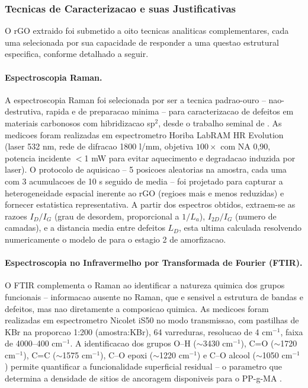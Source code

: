 \documentclass[11pt,a4paper,oneside]{article}
\begin{document}
\subsubsection{Tecnicas de Caracterizacao e suas Justificativas}

O rGO extraido foi submetido a oito tecnicas analiticas complementares, cada uma selecionada
por sua capacidade de responder a uma questao estrutural especifica, conforme detalhado a seguir.

\paragraph{Espectroscopia Raman.} A espectroscopia Raman foi selecionada por ser a tecnica
padrao-ouro -- nao-destrutiva, rapida e de preparacao minima -- para caracterizacao de defeitos
em materiais carbonosos com hibridizacao sp$^2$, desde o trabalho seminal de
\citet{Ferrari2000}. As medicoes foram realizadas em espectrometro Horiba LabRAM HR Evolution
(laser 532 nm, rede de difracao 1800 l/mm, objetiva $100{\times}$ com NA 0,90, potencia
incidente $<$1 mW para evitar aquecimento e degradacao induzida por laser). O protocolo de
aquisicao -- 5 posicoes aleatorias na amostra, cada uma com 3 acumulacoes de 10 s seguido de
media -- foi projetado para capturar a heterogeneidade espacial inerente ao rGO (regioes mais
e menos reduzidas) e fornecer estatistica representativa. A partir dos espectros obtidos,
extraem-se as razoes $I_D/I_G$ (grau de desordem, proporcional a $1/L_a$), $I_{2D}/I_G$ (numero
de camadas), e a distancia media entre defeitos $L_D$, esta ultima calculada resolvendo
numericamente o modelo de \citet{Ferrari2000} para o estagio 2 de amorfizacao.

\paragraph{Espectroscopia no Infravermelho por Transformada de Fourier (FTIR).} O FTIR
complementa o Raman ao identificar a natureza quimica dos grupos funcionais -- informacao
ausente no Raman, que e sensivel a estrutura de bandas e defeitos, mas nao diretamente a
composicao quimica. As medicoes foram realizadas em espectrometro Nicolet iS50 no modo
transmissao, com pastilhas de KBr na proporcao 1:200 (amostra:KBr), 64 varreduras, resolucao
de 4 cm$^{-1}$, faixa de 4000--400 cm$^{-1}$. A identificacao dos grupos O--H (${\sim}$3430
cm$^{-1}$), C=O (${\sim}$1720 cm$^{-1}$), C=C (${\sim}$1575 cm$^{-1}$), C--O epoxi (${\sim}$1220
cm$^{-1}$) e C--O alcool (${\sim}$1050 cm$^{-1}$) permite quantificar a funcionalidade
superficial residual -- o parametro que determina a densidade de sitios de ancoragem disponiveis
para o PP-g-MA \cite{Faria2017}.
\end{document}
